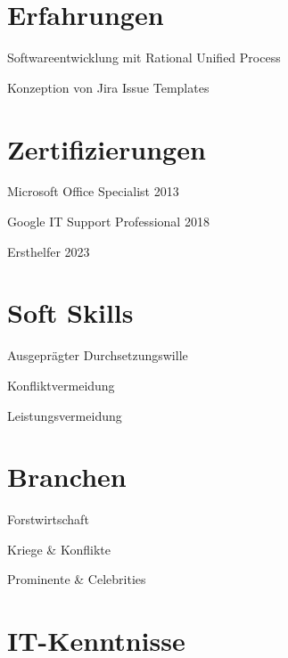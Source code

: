 \documentclass{germanqualificationprofile}
\begin{document}
\section*{Erfahrungen}

  \begin{listbullet}
    \item Softwareentwicklung mit Rational Unified Process
    \item Konzeption von Jira Issue Templates
  \end{listbullet}

\section*{Zertifizierungen}

  \begin{listbullet}
    \item Microsoft Office Specialist 2013
    \item Google IT Support Professional 2018
    \item Ersthelfer 2023
  \end{listbullet}

\section*{Soft Skills}

  \begin{listbullet}
    \item Ausgeprägter Durchsetzungswille
    \item Konfliktvermeidung
    \item Leistungsvermeidung
  \end{listbullet}

\section*{Branchen}

  \begin{listbullet}
    \item Forstwirtschaft
    \item Kriege \& Konflikte
    \item Prominente \& Celebrities
  \end{listbullet}

\section*{IT-Kenntnisse}
\end{document}
